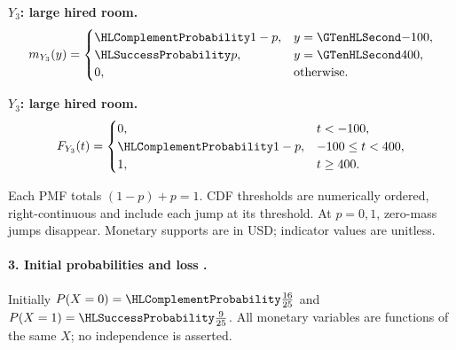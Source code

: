 \noindent\begin{minipage}[t]{.48\linewidth}
\textbf{$Y_3$: large hired room.}
\[m_{Y_3}(y)=\begin{cases}\FailureProb{1-p},&y=\Money{-100},\\\SuccessProb{p},&y=\Money{400},\\0,&\text{otherwise}.\end{cases}\]
\end{minipage}\par
{}
\noindent\begin{minipage}[t]{.48\linewidth}
\textbf{$Y_3$: large hired room.}
\[F_{Y_3}(t)=\begin{cases}0,&t<-100,\\\FailureProb{1-p},&-100\leq t<400,\\1,&t\geq 400.\end{cases}\]
\end{minipage}\par
Each PMF totals $(1-p)+p=1$. CDF thresholds are numerically ordered,
right-continuous and include each jump at its threshold. At $p=0,1$, zero-mass jumps disappear.
Monetary supports are in USD; indicator values are unitless.
\clearpage
{}\paragraph{3. Initial probabilities and loss \protect{}.}
Initially $P(X=0)=\FailureProb{\frac{16}{25}}$ and $P(X=1)=\SuccessProb{\frac{9}{25}}$.
All monetary variables are functions of the same $X$; no independence is asserted.
